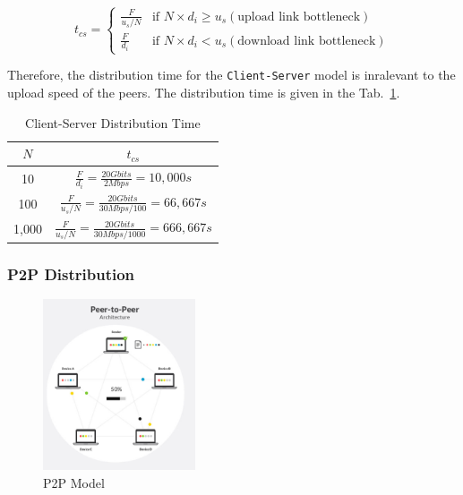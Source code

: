 \documentclass{cshwk}
\begin{document}
\begin{equation*}
    t_{cs} =
    \begin{cases}
        \frac{F}{u_s / N} & \text{if } N \times d_i \geq u_s (\text{upload link bottleneck}) \\
        \frac{F}{d_i}     & \text{if } N \times d_i < u_s (\text{download link bottleneck})
    \end{cases}
\end{equation*}

Therefore, the distribution time for the \texttt{Client-Server} model is inralevant to the upload speed of the peers. The distribution time is given in the Tab.~\ref{tab:cs}.

\begin{table}[H]
    \centering
    \begin{tabular}{cc}
        \toprule
        \( N \) & \( t_{cs} \)                                                \\
        \midrule
        10      & $\frac{F}{d_i} = \frac{20Gbits}{2Mbps} = 10,000s$           \\
        100     & $\frac{F}{u_s/N} = \frac{20Gbits}{30Mbps / 100} =66,667s $  \\
        1,000   & $\frac{F}{u_s/N} = \frac{20Gbits}{30Mbps/ 1000} = 666,667s$ \\
        \bottomrule
    \end{tabular}
    \caption{Client-Server Distribution Time}
    \label{tab:cs}
\end{table}

\subsubsection*{P2P Distribution}

\begin{figure}[H]
    \centering
    \includegraphics[width=0.4\textwidth]{hw2-4-2.png}
    \caption{P2P Model}
    \label{fig:p2p}
\end{figure}
\end{document}
